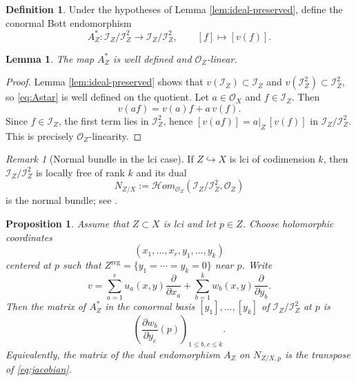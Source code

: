 \documentclass[12pt,a4paper,dvipsnames,x11names]{amsart}
\numberwithin{equation}{section}
\theoremstyle{plain}
\newtheorem{proposition}[theorem]{Proposition}
\newtheorem{lemma}[theorem]{Lemma}
\theoremstyle{definition}
\newtheorem{definition}[theorem]{Definition}
\theoremstyle{remark}
\newtheorem{remark}[theorem]{Remark}
\newcommand{\II}{\mathscr I}
\newcommand{\OO}{\mathscr O}
\newcommand{\reg}{\mathrm{reg}}
\begin{document}
\begin{definition}\label{def:Astar}
Under the hypotheses of Lemma \ref{lem:ideal-preserved}, define the conormal Bott endomorphism
\begin{equation}\label{eq:Astar}
A_Z^*:\II_Z/\II_Z^2\longrightarrow \II_Z/\II_Z^2,
\qquad [f]\longmapsto [v(f)].
\end{equation}
\end{definition}

\begin{lemma}\label{lem:Astar-linear}
The map $A_Z^*$ is well defined and $\OO_Z$-linear.
\end{lemma}

\begin{proof}
Lemma \ref{lem:ideal-preserved} shows that $v(\II_Z)\subset \II_Z$ and $v(\II_Z^2)\subset \II_Z^2$, so \eqref{eq:Astar} is well defined on the quotient.
Let $a\in \OO_X$ and $f\in \II_Z$. Then
\begin{equation}\label{eq:OZ-linearity-Astar}
v(af)=v(a)f+a\,v(f).
\end{equation}
Since $f\in \II_Z$, the first term lies in $\II_Z^2$, hence $[v(af)]=a|_Z\,[v(f)]$ in $\II_Z/\II_Z^2$. This is precisely $\OO_Z$-linearity.
\end{proof}

\begin{remark}[Normal bundle in the lci case]\label{rem:lci-conormal}
If $Z\hookrightarrow X$ is lci of codimension $k$, then $\II_Z/\II_Z^2$ is locally free of rank $k$ and its dual
\begin{equation}\label{eq:normal-lci}
N_{Z/X}:=  \mathscr{H}om_{\OO_Z}(\II_Z/\II_Z^2,\OO_Z)
\end{equation}
is the normal bundle; see \cite[\S 3]{Fischer76}.
\end{remark}

\begin{proposition}\label{prop:jacobian}
Assume that $Z\subset X$ is lci and let $p\in Z $. Choose holomorphic coordinates
\begin{equation}\label{eq:coords-jac}
(x_1,\dots,x_r,y_1,\dots,y_k)
\end{equation}
centered at $p$ such that $Z^\reg=\{y_1=\cdots=y_k=0\}$ near $p$. Write
\begin{equation}\label{eq:v-coordinates}
v=\sum_{a=1}^r u_a(x,y)\frac{\partial}{\partial x_a}+\sum_{b=1}^k w_b(x,y)\frac{\partial}{\partial y_b}.
\end{equation}
Then the matrix of $A_Z^*$ in the conormal basis $[y_1],\dots,[y_k]$ of $\II_Z/\II_Z^2$ at $p$ is
\begin{equation}\label{eq:jacobian}
\left(\frac{\partial w_b}{\partial y_c}(p)\right)_{1\le b,c\le k}.
\end{equation}
Equivalently, the matrix of the dual endomorphism $A_Z$ on $N_{Z/X,p}$ is the transpose of \eqref{eq:jacobian}.
\end{proposition}
\end{document}
